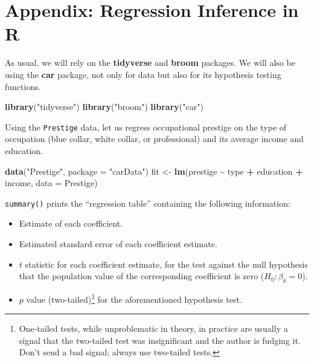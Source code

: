 \documentclass[
  12pt,
  oneside,openany]{book}
\newenvironment{Shaded}{\begin{snugshade}}{\end{snugshade}}
\newcommand{\DataTypeTok}[1]{\textcolor[rgb]{0.13,0.29,0.53}{#1}}
\newcommand{\KeywordTok}[1]{\textcolor[rgb]{0.13,0.29,0.53}{\textbf{#1}}}
\newcommand{\NormalTok}[1]{#1}
\newcommand{\OperatorTok}[1]{\textcolor[rgb]{0.81,0.36,0.00}{\textbf{#1}}}
\newcommand{\StringTok}[1]{\textcolor[rgb]{0.31,0.60,0.02}{#1}}
\providecommand{\tightlist}{%
  \setlength{\itemsep}{0pt}\setlength{\parskip}{0pt}}
\begin{document}
\hypertarget{appendix-regression-inference-in-r}{%
\section{Appendix: Regression Inference in R}\label{appendix-regression-inference-in-r}}

As usual, we will rely on the \textbf{tidyverse} and \textbf{broom} packages. We will also be using the \textbf{car} package, not only for data but also for its hypothesis testing functions.

\begin{Shaded}
\begin{Highlighting}[]
\KeywordTok{library}\NormalTok{(}\StringTok{"tidyverse"}\NormalTok{)}
\KeywordTok{library}\NormalTok{(}\StringTok{"broom"}\NormalTok{)}
\KeywordTok{library}\NormalTok{(}\StringTok{"car"}\NormalTok{)}
\end{Highlighting}
\end{Shaded}

Using the \texttt{Prestige} data, let us regress occupational prestige on the type of occupation (blue collar, white collar, or professional) and its average income and education.

\begin{Shaded}
\begin{Highlighting}[]
\KeywordTok{data}\NormalTok{(}\StringTok{"Prestige"}\NormalTok{, }\DataTypeTok{package =} \StringTok{"carData"}\NormalTok{)}
\NormalTok{fit <{-}}\StringTok{ }\KeywordTok{lm}\NormalTok{(prestige }\OperatorTok{\textasciitilde{}}\StringTok{ }\NormalTok{type }\OperatorTok{+}\StringTok{ }\NormalTok{education }\OperatorTok{+}\StringTok{ }\NormalTok{income, }\DataTypeTok{data =}\NormalTok{ Prestige)}
\end{Highlighting}
\end{Shaded}

\texttt{summary()} prints the ``regression table'' containing the following information:

\begin{itemize}
\tightlist
\item
  Estimate of each coefficient.
\item
  Estimated standard error of each coefficient estimate.
\item
  \(t\) statistic for each coefficient estimate, for the test against the null hypothesis that the population value of the corresponding coefficient is zero (\(H_0 : \beta_k = 0\)).
\item
  \(p\) value (two-tailed)\footnote{One-tailed tests, while unproblematic in theory, in practice are usually a signal that the two-tailed test was insignificant and the author is fudging it. Don't send a bad signal; always use two-tailed tests.} for the aforementioned hypothesis test.
\end{itemize}
\end{document}
